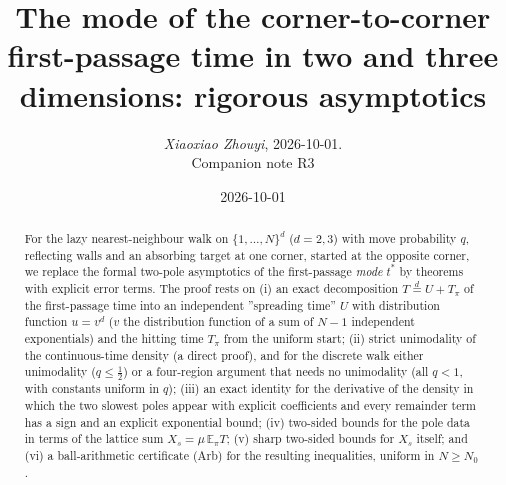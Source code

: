 \documentclass[11pt,a4paper]{article}
\title{The mode of the corner-to-corner first-passage time in two and three dimensions: rigorous asymptotics}
\author{\emph{Xiaoxiao Zhouyi}, 2026-10-01.\\ Companion note R3}
\date{2026-10-01}
\theoremstyle{definition}
\theoremstyle{remark}
\begin{document}
\setlength{\emergencystretch}{3em}
\maketitle
\medskip{}\par\medskip

\begin{abstract}
For the lazy nearest-neighbour walk on $\{1,\dots,N\}^d$ ($d=2,3$) with move probability $q$, reflecting walls and an absorbing target at one corner, started at the opposite corner, we replace the formal two-pole asymptotics of the first-passage \emph{mode} $t^*$ by theorems with explicit error terms. The proof rests on (i) an exact decomposition $T\overset{d}{=}U+T_\pi$ of the first-passage time into an independent ''spreading time'' $U$ with distribution function $u=v^d$ ($v$ the distribution function of a sum of $N-1$ independent exponentials) and the hitting time $T_\pi$ from the uniform start; (ii) strict unimodality of the continuous-time density (a direct proof), and for the discrete walk either unimodality ($q\le\frac12$) or a four-region argument that needs no unimodality (all $q<1$, with constants uniform in $q$); (iii) an exact identity for the derivative of the density in which the two slowest poles appear with explicit coefficients and every remainder term has a sign and an explicit exponential bound; (iv) two-sided bounds for the pole data in terms of the lattice sum $X_s=\mu\,\mathbb E_\pi T$; (v) sharp two-sided bounds for $X_s$ itself; and (vi) a ball-arithmetic certificate (Arb) for the resulting inequalities, uniform in $N\ge N_0$.
\end{abstract}
\end{document}
